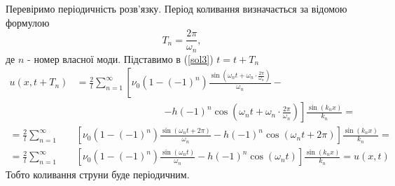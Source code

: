 \documentclass[a4paper, 14pt]{extreport}
\begin{document}
Перевіримо періодичність розв'язку. Період коливання визначається за відомою формулою \[T_n = \frac{2\pi}{\omega_n},\] де $n$ - номер власної моди. Підставимо в (\ref{sol3}) $t = t + T_n$
\begin{equation*}
    \begin{aligned}
        u(x,t+T_n) & = \frac{2}{l}\sum^{\infty}_{n=1} \left[\nu_0 (1 - (-1)^n)\frac{\sin(\omega_n t + \omega_n \cdot \frac{2\pi}{\omega_n})}{\omega_n} -\right.\\
        &\qquad\qquad\qquad\qquad\quad\left.- h(-1)^n\cos(\omega_n t + \omega_n \cdot \frac{2\pi}{\omega_n})\right] \frac{\sin(k_n x)}{k_n} =\\
        = \frac{2}{l}\sum^{\infty}_{n=1} & \left[\nu_0 (1 - (-1)^n)\frac{\sin(\omega_n t + 2\pi)}{\omega_n} - h(-1)^n\cos(\omega_n t + 2\pi)\right] \frac{\sin(k_n x)}{k_n} =\\ 
        = \frac{2}{l}\sum^{\infty}_{n=1} & \left[\nu_0 (1 - (-1)^n)\frac{\sin(\omega_n t)}{\omega_n} - h(-1)^n\cos(\omega_n t)\right] \frac{\sin(k_n x)}{k_n} = u(x,t)
    \end{aligned}
\end{equation*} 
Тобто коливання струни буде періодичним.
\end{document}
